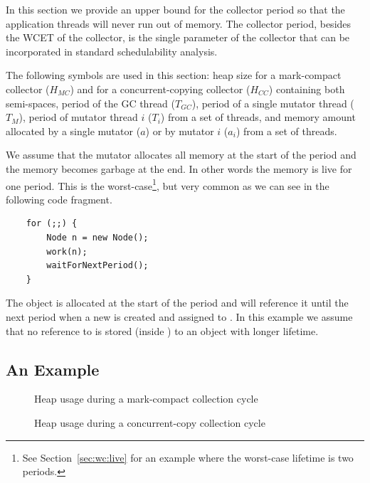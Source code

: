 In this section we provide an upper bound for the collector period
so that the application threads will never run out of memory. The
collector period, besides the WCET of the collector, is the single
parameter of the collector that can be incorporated in standard
schedulability analysis.

The following symbols are used in this section: heap size for a
mark-compact collector ($H_{MC}$) and for a concurrent-copying
collector ($H_{CC}$) containing both semi-spaces, period of the GC
thread ($T_{GC}$), period of a single mutator thread ($T_M$), period
of mutator thread $i$ ($T_i$) from a set of threads, and memory
amount allocated by a single mutator ($a$) or by mutator $i$ ($a_i$)
from a set of threads.

We assume that the mutator allocates all memory at the start of the
period and the memory becomes garbage at the end. In other words the
memory is live for one period. This is the worst-case\footnote{See
Section~\ref{sec:wc:live} for an example where the worst-case
lifetime is two periods.}, but very common as we can see in the
following code fragment.
\begin{samepage}
%
{\small
\begin{verbatim}
    for (;;) {
        Node n = new Node();
        work(n);
        waitForNextPeriod();
    }
\end{verbatim}
}
\end{samepage}
The object  is allocated at the start of the period and
 will reference it until the next period when a new
 is created and assigned to . In this example we
assume that no reference to  is stored (inside
) to an object with longer lifetime.




\subsection{An Example} \label{sec:example}

\begin{figure}
\begin{center}
    
    \caption{Heap usage during a mark-compact collection cycle}
\label{fig:exmc}
\end{center}
\end{figure}

\begin{figure}
\begin{center}
    
    \caption{Heap usage during a concurrent-copy collection cycle}
\label{fig:excc}
\end{center}
\end{figure}



